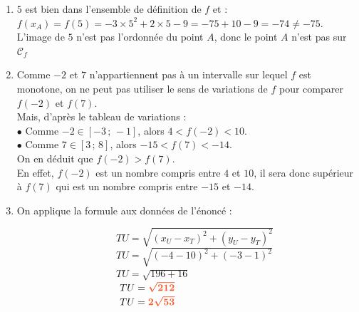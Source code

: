 \documentclass[a4paper,11pt]{article}
\newcounter{seancenum}
\begin{document}
\setcounter{seancenum}{22}
\newpage
\begin{seance}{} %

\begin{enumerate}
\item   $5$ est bien dans l'ensemble de définition de $f$ et :\\ 
                $f(x_A)=f(5)=-3\times 5^2+2\times5-9
                =-75+10-9=-74\neq-75$.\\
                L'image de $5$ n'est pas l'ordonnée du point $A$, donc le point $A$ n'est pas sur $\mathscr{C}_f$
                
\item  Comme $-2$ et $7$ n'appartiennent pas à un intervalle sur lequel $f$ est monotone, on ne peut pas utiliser le sens de variations de $f$ pour comparer $f(-2)$ et $f(7)$.\\
                Mais, d'après le tableau de variations :\\
                $\bullet$ Comme $-2\in [-3\,;\,-1]$, alors $4 < f(-2) < 10$. \\
                $\bullet$ Comme $7\in [3\,;\,8]$, alors $-15 < f(7) < -14$. \\
                On en déduit que {\bfseries \color[HTML]{f15929}$f(-2) > f(7)$}.\\
                En effet, $f(-2)$ est un nombre compris entre  $4$ et $10$, il sera donc supérieur à  $f(7)$ qui est un nombre compris entre $-15$ et $-14$.

\item On applique la formule aux données de l'énoncé :

\medskip
$\phantom{On applique la formule  : } TU=\sqrt{\left(x_U-x_T\right)^{2}+\left(y_U-y_T\right)^{2}}$\\$\phantom{On applique la formule  : }TU=\sqrt{\left(-4-10\right)^{2}+\left(-3-1\right)^{2}}$\\$\phantom{On applique la formule :        } TU=\sqrt{196+16}$\\$\phantom{On applique la formule  :        } TU={\color[HTML]{f15929}\boldsymbol{\sqrt{212}}}$\\$\phantom{On applique la formule  :     } TU={\color[HTML]{f15929}\boldsymbol{2\sqrt{53}}}$\\


\end{enumerate}
\end{seance}
\end{document}
